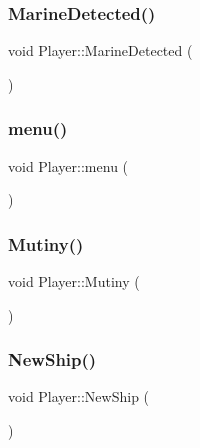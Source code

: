 \mbox{\label{class_player_a34f7b1e13c7b3a7bba123ab7bff1cfba}} 
\subsubsection{\texorpdfstring{Marine\+Detected()}{MarineDetected()}}
{\footnotesize\ttfamily void Player\+::\+Marine\+Detected (\begin{DoxyParamCaption}{ }\end{DoxyParamCaption})}

\mbox{\label{class_player_a90bf77e4e5c33089e3f8136a887ed63a}} 
\subsubsection{\texorpdfstring{menu()}{menu()}}
{\footnotesize\ttfamily void Player\+::menu (\begin{DoxyParamCaption}{ }\end{DoxyParamCaption})}

\mbox{\label{class_player_a00d925d7fbf8af5eb7aaae82667d4968}} 
\subsubsection{\texorpdfstring{Mutiny()}{Mutiny()}}
{\footnotesize\ttfamily void Player\+::\+Mutiny (\begin{DoxyParamCaption}{ }\end{DoxyParamCaption})}

\mbox{\label{class_player_a235e967a3d74eeb64f983cf8a6db3272}} 
\subsubsection{\texorpdfstring{New\+Ship()}{NewShip()}}
{\footnotesize\ttfamily void Player\+::\+New\+Ship (\begin{DoxyParamCaption}{ }\end{DoxyParamCaption})}

